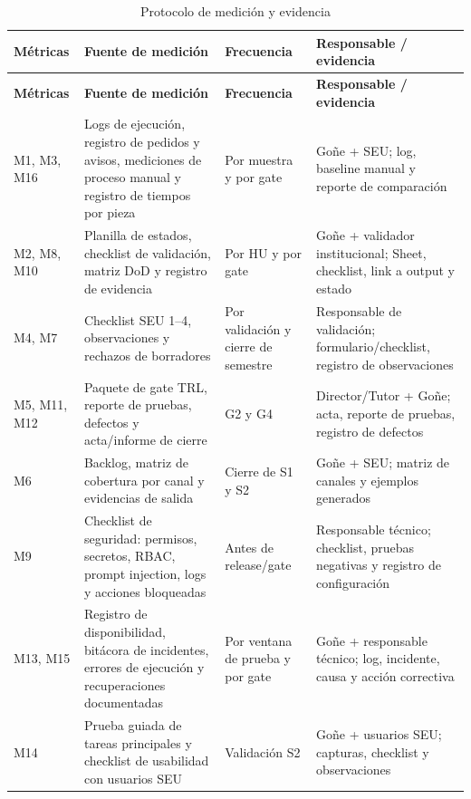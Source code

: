 \documentclass[a4paper, 12pt]{article}
\begin{document}
{\footnotesize
\begin{longtable}{L{0.14\textwidth}L{0.32\textwidth}L{0.16\textwidth}L{0.30\textwidth}}
  \caption{Protocolo de medici\'on y evidencia}
  \label{tab:protocolo-medicion}\\
    \toprule
    \textbf{M\'etricas} & \textbf{Fuente de medici\'on} & \textbf{Frecuencia} & \textbf{Responsable / evidencia} \\
    \midrule
    \endfirsthead
    \toprule
    \textbf{M\'etricas} & \textbf{Fuente de medici\'on} & \textbf{Frecuencia} & \textbf{Responsable / evidencia} \\
    \midrule
    \endhead
    M1, M3, M16 & Logs de ejecuci\'on, registro de pedidos y avisos, mediciones de proceso manual y registro de tiempos por pieza & Por muestra y por gate & Go\~ne + \ac{SEU}; log, baseline manual y reporte de comparaci\'on \\
    M2, M8, M10 & Planilla de estados, checklist de validaci\'on, matriz \ac{DoD} y registro de evidencia & Por \ac{HU} y por gate & Go\~ne + validador institucional; Sheet, checklist, link a output y estado \\
    M4, M7 & Checklist \ac{SEU} 1--4, observaciones y rechazos de borradores & Por validaci\'on y cierre de semestre & Responsable de validaci\'on; formulario/checklist, registro de observaciones \\
    M5, M11, M12 & Paquete de gate \ac{TRL}, reporte de pruebas, defectos y acta/informe de cierre & G2 y G4 & Director/Tutor + Go\~ne; acta, reporte de pruebas, registro de defectos \\
    M6 & Backlog, matriz de cobertura por canal y evidencias de salida & Cierre de S1 y S2 & Go\~ne + \ac{SEU}; matriz de canales y ejemplos generados \\
    M9 & Checklist de seguridad: permisos, secretos, \ac{RBAC}, prompt injection, logs y acciones bloqueadas & Antes de release/gate & Responsable t\'ecnico; checklist, pruebas negativas y registro de configuraci\'on \\
    M13, M15 & Registro de disponibilidad, bit\'acora de incidentes, errores de ejecuci\'on y recuperaciones documentadas & Por ventana de prueba y por gate & Go\~ne + responsable t\'ecnico; log, incidente, causa y acci\'on correctiva \\
    M14 & Prueba guiada de tareas principales y checklist de usabilidad con usuarios \ac{SEU} & Validaci\'on S2 & Go\~ne + usuarios \ac{SEU}; capturas, checklist y observaciones \\
    \bottomrule
\end{longtable}
}
\end{document}
